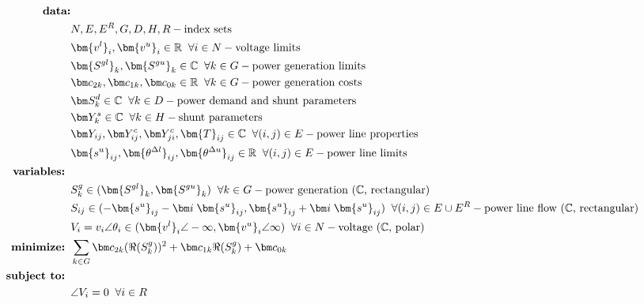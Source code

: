 \begin{align}
%
\mbox{\bf data:} & \nonumber \\ 
& N, E, E^R, G, D, H, R - \mbox{index sets} \nonumber \\ 
& \bm {v^l}_i, \bm {v^u}_i \in \mathbb{R} \;\; \forall i \in N - \mbox{voltage limits} \nonumber \\
& \bm {S^{gl}}_k, \bm {S^{gu}}_k \in \mathbb{C} \;\; \forall k \in G - \mbox{power generation limits} \nonumber \\
& \bm c_{2k}, \bm c_{1k}, \bm c_{0k} \in \mathbb{R} \;\; \forall k \in G - \mbox{power generation costs} \nonumber \\
& \bm S^d_k \in \mathbb{C} \;\; \forall k \in D - \mbox{power demand and shunt parameters} \nonumber \\
& \bm Y^s_k \in \mathbb{C} \;\; \forall k \in H - \mbox{shunt parameters} \nonumber \\
& \bm Y_{ij}, \bm Y^c_{ij}, \bm Y^c_{ji}, \bm{T}_{ij} \in \mathbb{C} \;\; \forall (i,j) \in E - \mbox{power line properties} \nonumber \\
& \bm {s^u}_{ij}, \bm {\theta^{\Delta l}}_{ij}, \bm {\theta^{\Delta u}}_{ij} \in \mathbb{R} \;\; \forall (i,j) \in E - \mbox{power line limits} \nonumber \\
%
\mbox{\bf variables: } & \nonumber \\
& S^g_k \in (\bm {S^{gl}}_k, \bm {S^{gu}}_k) \;\; \forall k\in G - \mbox{power generation ($\mathbb{C}$, rectangular)} \nonumber \\
& S_{ij} \in (-\bm {s^u}_{ij} - \bm i \;
 \bm {s^u}_{ij}, \bm {s^u}_{ij} + \bm i \;
 \bm {s^u}_{ij}) \;\; \forall (i,j) \in E \cup E^R - \mbox{power line flow ($\mathbb{C}$, rectangular)} \nonumber \\
& V_i = v_i \angle \theta_i \in (\bm {v^l}_i \angle -\infty, \bm {v^u}_i \angle \infty) \;\; \forall i\in N \nonumber - \mbox{voltage ($\mathbb{C}$, polar)} \\
%
\mbox{\bf minimize: } & \sum_{k \in G} \bm c_{2k} (\Re(S^g_k))^2 + \bm c_{1k}\Re(S^g_k) + \bm c_{0k} \\
%
\mbox{\bf subject to: } & \nonumber \\
& \angle V_i = 0 \;\; \forall i \in R \\

\end{align}
